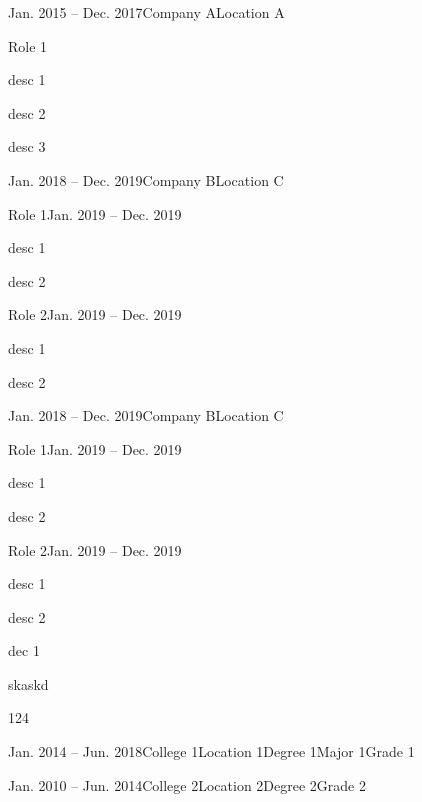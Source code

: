 \documentclass[12pt,a4paper,lang=de]{mycv}
\begin{document}
	\makecvheader
	\begin{profexperience}
		\begin{experienceentry}{Jan. 2015 -- Dec. 2017}{Company A}{Location A}
			\begin{role}{Role 1}{}
				\item desc 1
				\item desc 2
				\item desc 3
			\end{role}
		\end{experienceentry}
		\begin{experienceentry}{Jan. 2018 -- Dec. 2019}{Company B}{Location C}
			\begin{role}{Role 1}{Jan. 2019 -- Dec. 2019}
				\item desc 1
				\item desc 2
			\end{role}
			\begin{role}{Role 2}{Jan. 2019 -- Dec. 2019}
				\item desc 1
				\item desc 2
			\end{role}
		\end{experienceentry}
		\begin{experienceentry}{Jan. 2018 -- Dec. 2019}{Company B}{Location C}
			\begin{role}{Role 1}{Jan. 2019 -- Dec. 2019}
				\item desc 1
				\item desc 2
			\end{role}
			\begin{role}{Role 2}{Jan. 2019 -- Dec. 2019}
				\item desc 1
				\item desc 2
				\item dec 1
				\item skaskd
				\item 124
			\end{role}
		\end{experienceentry}
	\end{profexperience}
	\begin{academics}
		\begin{acadentry}{Jan. 2014 -- Jun. 2018}{College 1}{Location 1}{Degree 1}{Major 1}{Grade 1}
		\end{acadentry}
		\begin{acadentry}{Jan. 2010 -- Jun. 2014}{College 2}{Location 2}{Degree 2}{}{Grade 2}
		\end{acadentry}
	\end{academics}
	\begin{skills}
	\end{skills}
\end{document}
